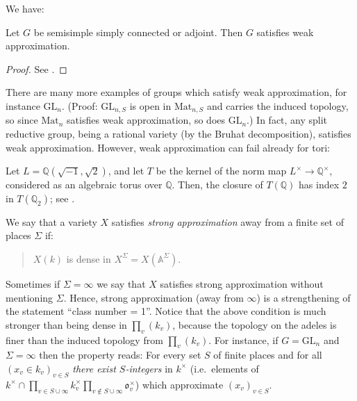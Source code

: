 We have:
\begin{theorem}
\label{theorem-weak-approximation}
 Let $G$ be semisimple simply connected or adjoint. Then $G$ satisfies weak approximation.
\end{theorem}

\begin{proof}
 See \cite[Theorem 7.8]{Platonov-Rapinchuk}.
\end{proof}

There are many more examples of groups which satisfy weak approximation, for instance $\text{GL}_n$. (Proof: $\text{GL}_{n,S}$ is open in $\text{Mat}_{n,S}$ and carries the induced topology, so since $\text{Mat}_n$ satisfies weak approximation, so does $\text{GL}_n$.) In fact, any split reductive group, being a rational variety (by the Bruhat decomposition), satisfies weak approximation. However, weak approximation can fail already for tori:

\begin{example}
 \label{example-failure-weak-approximation}
Let $L = \mathbb Q(\sqrt{-1},\sqrt{2})$, and let $T$ be the kernel of the norm map $L^\times \to \mathbb Q^\times$, considered as an algebraic torus over $\mathbb Q$. Then, the closure of $T(\mathbb Q)$ has index $2$ in $T(\mathbb Q_2)$; see \cite[p.423]{Platonov-Rapinchuk}.
\end{example}


\begin{definition}
 \label{definition-strong-approximation}
We say that a variety $X$ satisfies {\it strong approximation} away from a finite set of places $\Sigma$ if:
\begin{quote}
 $X(k)$ is dense in $X^\Sigma=X(\mathbb A^\Sigma)$. 
\end{quote}
Sometimes if $\Sigma=\infty$ we say that $X$ satisfies strong approximation without mentioning $\Sigma$. Hence, strong approximation (away from $\infty$) is a strengthening of the statement ``class number = 1''. Notice that the above condition is much stronger than being dense in $\prod_v(k_v)$, because the topology on the adeles is finer than the induced topology from $\prod_v(k_v)$. For instance, if $G=\text{GL}_n$ and $\Sigma=\infty$ then the property reads: For every set $S$ of finite places and for all $(x_v\in k_v)_{v\in S}$ \emph{there exist $S$-integers} in $k^\times$ (i.e.\ elements of $k^\times\cap \prod_{v\in S\cup\infty} k_v^\times \prod_{v\notin S\cup\infty} \mathfrak o_v^\times$) which approximate $(x_v)_{v\in S}$. 
 
\end{definition}




